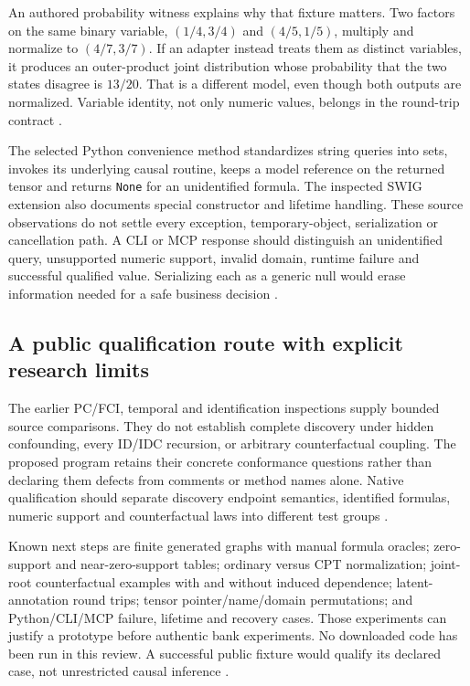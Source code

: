 An authored probability witness explains why that fixture matters. Two
factors on the same binary variable, $(1/4,3/4)$ and $(4/5,1/5)$, multiply
and normalize to $(4/7,3/7)$. If an adapter instead treats them as distinct
variables, it produces an outer-product joint distribution whose
probability that the two states disagree is $13/20$. That is a different
model, even though both outputs are normalized. Variable identity, not only
numeric values, belongs in the round-trip contract
\citep{exec24_agrum_choice}.

The selected Python convenience method standardizes string queries into
sets, invokes its underlying causal routine, keeps a model reference on the
returned tensor and returns \texttt{None} for an unidentified formula.
The inspected SWIG extension also documents special constructor and lifetime
handling. These source observations do not settle every exception,
temporary-object, serialization or cancellation path. A CLI or MCP response
should distinguish an unidentified query, unsupported numeric support,
invalid domain, runtime failure and successful qualified value. Serializing
each as a generic null would erase information needed for a safe business
decision \citep{exec24_agrum_source,exec24_agrum_choice}.

\subsection{A public qualification route with explicit research limits}
The earlier PC/FCI, temporal and identification inspections supply bounded
source comparisons. They do not establish complete discovery under hidden
confounding, every ID/IDC recursion, or arbitrary counterfactual coupling.
The proposed program retains their concrete conformance questions rather
than declaring them defects from comments or method names alone. Native
qualification should separate discovery endpoint semantics, identified
formulas, numeric support and counterfactual laws into different test groups
\citep{exec13_cxx_agrum,exec14_native_agrum,exec16_ct_agrum,
exec19_cxx_identification_source,exec24_agrum_choice}.

Known next steps are finite generated graphs with manual formula oracles;
zero-support and near-zero-support tables; ordinary versus CPT normalization;
joint-root counterfactual examples with and without induced dependence;
latent-annotation round trips; tensor pointer/name/domain permutations;
and Python/CLI/MCP failure, lifetime and recovery cases. Those experiments
can justify a prototype before authentic bank experiments. No downloaded
code has been run in this review. A successful public fixture would qualify
its declared case, not unrestricted causal inference
\citep{exec24_agrum_choice}.

